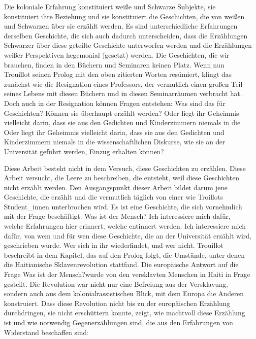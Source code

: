 \documentclass[11pt]{article}
\begin{document}
Die koloniale Erfahrung konstituiert weiße und Schwarze Subjekte, sie
konstituiert ihre Beziehung und sie konstituiert die Geschichten, die von weißen
und Schwarzen über sie erzählt werden. Es sind unterschiedliche Erfahrungen
derselben Geschichte, die sich auch dadurch unterscheiden, dass die Erzählungen
Schwarzer über diese geteilte Geschichte unterworfen werden und die Erzählungen
weißer Perspektiven hegemonial (gesetzt) werden.  Die Geschichten, die wir
brauchen, finden in den Büchern und Seminaren keinen Platz.  Wenn nun Trouillot
seinen Prolog mit den oben zitierten Worten resümiert, klingt das zunächst wie
die Resignation eines Professors, der vermutlich einen großen Teil seines Lebens
mit diesen Büchern und in diesen Seminarräumen verbracht hat. Doch auch in der
Resignation können Fragen entstehen: Was sind das für Geschichten? Können sie
überhaupt erzählt werden? Oder liegt ihr Geheimnis vielleicht darin, dass sie
aus den Gedichten und Kinderzimmern niemals in die Oder liegt ihr Geheimnis
vielleicht darin, dass sie aus den Gedichten und Kinderzimmern niemals in die
wissenschaftlichen Diskurse, wie sie an der Universität geführt werden, Einzug
erhalten können?

Diese Arbeit besteht nicht in dem Versuch, diese Geschichten zu erzählen. Diese
Arbeit versucht, die Leere zu beschreiben, die entsteht, weil diese Geschichten
nicht erzählt werden.  Den Ausgangspunkt dieser Arbeit bildet darum jene
Geschichte, die erzählt und die vermutlich täglich von einer wie Troillots
Student\_innen unterbrochen wird. Es ist eine Geschichte, die sich vornehmlich
mit der Frage beschäftigt: Was ist der Mensch?  Ich interessiere mich dafür,
welche Erfahrungen hier erinnert, welche entinnert werden. Ich interessiere mich
dafür, von wem und für wen diese Geschichte, die an der Universität erzählt
wird, geschrieben wurde. Wer sich in ihr wiederfindet, und wer nicht.  Trouillot
beschreibt in dem Kapitel, das auf den Prolog folgt, die Umstände, unter denen
die Haitianische Sklavenrevolution stattfand. Die europäische Antwort auf die
Frage \glqq Was ist der Mensch?\grqq wurde von den versklavten Menschen in Haiti in Frage
gestellt. Die Revolution war nicht nur eine Befreiung aus der Versklavung,
sondern auch aus dem kolonialrassistischen Blick, mit dem Europa die Anderen
konstruiert. Dass diese Revolution nicht bis zu der europäischen Erzählung
durchdringen, sie nicht erschüttern konnte, zeigt, wie machtvoll diese Erzählung
ist und wie notwendig Gegenerzählungen sind, die aus den Erfahrungen von
Widerstand beschaffen sind:
\end{document}
